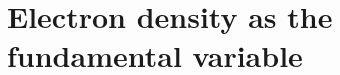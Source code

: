 \documentclass[11pt,bibliography=totoc,index=totoc]{scrbook}   %
\begin{document}


%
\section{Electron density as the fundamental variable}\label{sec:dft}
%
\end{document}

